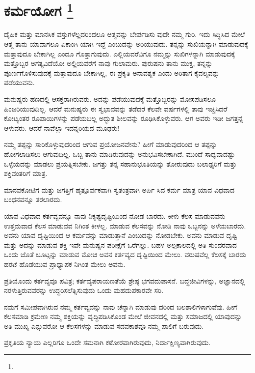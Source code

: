 
\chapter[ಕರ್ಮಯೋಗ ]{ಕರ್ಮಯೋಗ \protect\footnote{}}

ದೈಹಿಕ ಮತ್ತು ಮಾನಸಿಕ ವಸ್ತುಗಳೆಲ್ಲದರಿಂದಲೂ ಆತ್ಮವನ್ನು ಬೇರ್ಪಡಿಸು ವುದೇ ನಮ್ಮ ಗುರಿ. ಇದು ಸಿದ್ಧಿಸಿದ ಮೇಲೆ ಆತ್ಮ ತಾನು ಯಾವಾಗಲೂ ಏಕಾಂಗಿ ಯಾಗಿ ಇದ್ದೆ ಎಂಬುದನ್ನು ಅರಿಯುವುದು. ತನ್ನನ್ನು ಸುಖಿಯನ್ನಾಗಿ ಮಾಡುವುದಕ್ಕೆ ಮತ್ತಾವುದೂ ಬೇಕಾಗಿಲ್ಲ ಎಂದೂ ಗೊತ್ತಾಗುವುದು. ಎಲ್ಲಿಯವರೆವಿಗೂ ನಮ್ಮನ್ನು ಸುಖಿಗಳನ್ನಾಗಿ ಮಾಡುವುದಕ್ಕೆ ಮತ್ತೊಬ್ಬರ ಅಗತ್ಯವಿದೆಯೋ ಅಲ್ಲಿಯವರೆಗೆ ನಾವು ಗುಲಾಮರು. ಪುರುಷನು ತಾನು ಮುಕ್ತ, ತನ್ನನ್ನು ಪೂರ್ಣಗೊಳಿಸುವುದಕ್ಕೆ ಮತ್ತಾವುದೂ ಬೇಕಾಗಿಲ್ಲ, ಈ ಪ್ರಕೃತಿ ಅನಾವಶ್ಯಕ ಎಂದು ಅರಿತಾಗ ಕೈವಲ್ಯವನ್ನು ಪಡೆಯುವನು.

ಮನುಷ್ಯರು ಹಣದಲ್ಲಿ ಆಸಕ್ತರಾಗಿರುವರು. ಅದನ್ನು ಪಡೆಯುವುದಕ್ಕೆ ಮತ್ತೊಬ್ಬರನ್ನು ಮೋಸಪಡಿಸಲೂ ಹಿಂಜರಿಯುವುದಿಲ್ಲ. ಆದರೆ ಮನುಷ್ಯರು ಈ ಸ್ವಭಾವವನ್ನು ತಡೆದರೆ ಕೆಲವೇ ವರ್ಷಗಳಲ್ಲಿ ತಾವು ಇಚ್ಚಿಸಿದರೆ ಕೋಟ್ಯಂತರ ರೂಪಾಯಿಗಳನ್ನು ಪಡೆಯಬಲ್ಲ ಅದ್ಭುತ ಶೀಲವನ್ನು ರೂಢಿಸಿಕೊಳ್ಳುವರು. ಆಗ ಅವರು ಇಡೀ ಜಗತ್ತನ್ನೆ ಆಳುವರು. ಆದರೆ ನಾವೆಲ್ಲಾ ಇದನ್ನರಿಯದ ಮೂಢರು!

ನಮ್ಮ ತಪ್ಪನ್ನು ಸಾರಿಕೊಳ್ಳುವುದರಿಂದ ಆಗುವ ಪ್ರಯೋಜನವೇನು? ಹೀಗೆ ಮಾಡುವುದರಿಂದ ಆ ತಪ್ಪನ್ನು ಹೋಗಲಾಡಿಸಲು ಆಗುವುದಿಲ್ಲ. ಒಬ್ಬ ತಾನು ಮಾಡಿರುವುದನ್ನು ಅನುಭವಿಸಬೇಕಾಗಿದೆ. ಮುಂದೆ ಸಾಧ್ಯವಾದಷ್ಟು ಒಳ್ಳೆಯದನ್ನು ಮಾಡಲು ಪ್ರಯತ್ನಿಸಬೇಕು. ಜಗತ್ತು ತನ್ನ ಸಹಾನುಭೂತಿಯನ್ನು ತೋರುವುದು ಬಲಾಢ್ಯರಿಗೆ ಮತ್ತು ಶಕ್ತಿವಂತರಿಗೆ ಮಾತ್ರ.

ಮಾನವಕೋಟಿಗೆ ಮತ್ತು ಜಗತ್ತಿಗೆ ಹೃತ್ಪೂರ್ವಕವಾಗಿ ಸ್ವತಂತ್ರವಾಗಿ ಅರ್ಪಿ ಸಿದ ಕರ್ಮ ಮಾತ್ರ ಯಾವ ವಿಧವಾದ ಬಂಧನವನ್ನೂ ತರಲಾರದು.

ಯಾವ ವಿಧವಾದ ಕರ್ತವ್ಯವನ್ನೂ ನಾವು ನಿಕೃಷ್ಟದೃಷ್ಟಿಯಿಂದ ನೋಡ ಬಾರದು. ಕೀಳು ಕೆಲಸ ಮಾಡುವವನು ಉತ್ತಮವಾದ ಕೆಲಸ ಮಾಡುವವ ನಿಗಿಂತ ಕೀಳಲ್ಲ. ಮಾಡುವ ಕೆಲಸವನ್ನು ನೋಡಿ ನಾವು ಒಬ್ಬನನ್ನು ಅಳೆಯಬಾರದು. ಅವನು ಯಾವ ದೃಷ್ಟಿಯಿಂದ ಆ ಕರ್ಮವನ್ನು ಮಾಡುತ್ತಾನೆ ಎಂಬುದನ್ನು ನೋಡಬೇಕು. ಅವನು ಮಾಡುವ ದೃಷ್ಟಿ ಮತ್ತು ಅದನ್ನು ಮಾಡುವ ಶಕ್ತಿ ಇವೇ ಮನುಷ್ಯನ ಪರೀಕ್ಷೆಗೆ ಒರೆಗಲ್ಲು. ಬಹಳ ಅಲ್ಪಕಾಲದಲ್ಲಿ ಅತಿ ಸುಂದರವಾದ ಒಂದು ಜೊತೆ ಬೂಟ್ಸನ್ನು ಮಾಡುವ ಮೋಚಿ ಅವನ ಕರ್ತವ್ಯದ ದೃಷ್ಟಿಯಿಂದ ಮೇಲು. ವರುಷವೆಲ್ಲ ಕೆಲಸಕ್ಕೆ ಬಾರದು ಹರಟೆ ಹೊಡೆಯುವ ಪ್ರಾಧ್ಯಾಪಕ ನಿಗಿಂತ ಮೇಲು ಅವನು.

ಪ್ರತಿಯೊಂದು ಕರ್ತವ್ಯವೂ ಪವಿತ್ರ; ಕರ್ತವ್ಯಪರಾಯಣತೆಯೆ ಶ್ರೇಷ್ಠ ಭಗವದುಪಾಸನೆ. ಬದ್ಧಜೀವಿಗಳನ್ನು, ಅಜ್ಞಾನದಲ್ಲಿ ನರಳುತ್ತಿರುವವರನ್ನು ಉದ್ಧರಿಸಲೆತ್ನಿಸುವುದು ಒಂದು ಮಹದುಪಕಾರವೇ ಸರಿ.

ನಮಗೆ ಸಮೀಪವಾಗಿರುವ ನಮ್ಮ ಕರ್ತವ್ಯವನ್ನು ನಾವು ಚೆನ್ನಾಗಿ ಮಾಡುವು ದರಿಂದ ಬಲಶಾಲಿಗಳಾಗುವೆವು. ಹೀಗೆ ಕೆಲಸಮಾಡಿ ಕ್ರಮೇಣ ನಮ್ಮ ಶಕ್ತಿಯನ್ನು ವೃದ್ಧಿಪಡಿಸಿಕೊಂಡ ಮೇಲೆ ಜೀವನದಲ್ಲಿ ಮತ್ತು ಸಮಾಜದಲ್ಲಿ ಯಾವುದನ್ನು ಅತಿ ಮುಖ್ಯ ಎನ್ನುವರೋ ಆ ಕೆಲಸಗಳನ್ನು ಮಾಡುವ ಸದವಕಾಶವೂ ನಮ್ಮ ಪಾಲಿಗೆ ಬರುವುದು.

ಪ್ರಕೃತಿಯ ನ್ಯಾಯ ಎಲ್ಲರಿಗೂ ಒಂದೇ ಸಮನಾಗಿ ಕಠೋರವಾಗಿರುವುದು, ನಿರ್ದಾಕ್ಷಿಣ್ಯವಾಗಿರುವುದು.

